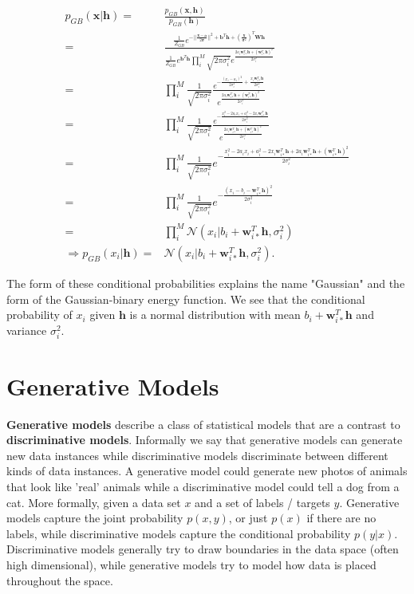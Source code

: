 \documentclass[%
oneside,                 %
final,                   %
10pt]{article}
\begin{document}
\begin{align}
	p_{GB} (\bm{x}|\bm{h})
	=& \frac{p_{GB} (\bm{x}, \bm{h})}{p_{GB} (\bm{h})} \nonumber \\
	=& \frac{\frac{1}{Z_{GB}} e^{-\vert\vert\frac{\bm{x} -\bm{a}}{2\bm{\sigma}}\vert\vert^2 + \bm{b}^T \bm{h} 
	+ (\frac{\bm{x}}{\bm{\sigma}^2})^T \bm{W}\bm{h}}}
	{\frac{1}{Z_{GB}} e^{\bm{b}^T \bm{h}} \prod_i^M
	\sqrt{2\pi \sigma_i^2}
	e^{\frac{2a_i \bm{w}_{i\ast}^T \bm{h} +(\bm{w}_{i\ast}^T \bm{h})^2 }{2\sigma_i^2}}}
	\nonumber \\
	=& \prod_i^M \frac{1}{\sqrt{2\pi \sigma_i^2}}
	\frac{e^{- \frac{(x_i - a_i)^2}{2\sigma_i^2} + \frac{x_i \bm{w}_{i\ast}^T \bm{h}}{2\sigma_i^2} }}
	{e^{\frac{2a_i \bm{w}_{i\ast}^T \bm{h} +(\bm{w}_{i\ast}^T \bm{h})^2 }{2\sigma_i^2}}}
	\nonumber \\
	=& \prod_i^M \frac{1}{\sqrt{2\pi \sigma_i^2}}
	\frac{e^{-\frac{x_i^2 - 2a_i x_i + a_i^2 - 2x_i \bm{w}_{i\ast}^T\bm{h} }{2\sigma_i^2} } }
	{e^{\frac{2a_i \bm{w}_{i\ast}^T \bm{h} +(\bm{w}_{i\ast}^T \bm{h})^2 }{2\sigma_i^2}}}
	\nonumber \\
	=& \prod_i^M \frac{1}{\sqrt{2\pi \sigma_i^2}}
	e^{- \frac{x_i^2 - 2a_i x_i + a_i^2 - 2x_i \bm{w}_{i\ast}^T\bm{h}
	+ 2a_i \bm{w}_{i\ast}^T \bm{h} +(\bm{w}_{i\ast}^T \bm{h})^2}
	{2\sigma_i^2} }
	\nonumber \\
	=& \prod_i^M \frac{1}{\sqrt{2\pi \sigma_i^2}}
	e^{ - \frac{(x_i - b_i - \bm{w}_{i\ast}^T \bm{h})^2}{2\sigma_i^2}} \nonumber \\
	=& \prod_i^M \mathcal{N}
	(x_i | b_i + \bm{w}_{i\ast}^T \bm{h}, \sigma_i^2) \\
	\Rightarrow p_{GB} (x_i|\bm{h}) =& \mathcal{N}
	(x_i | b_i + \bm{w}_{i\ast}^T \bm{h}, \sigma_i^2) .
\end{align}

The form of these conditional probabilities explains the name
"Gaussian" and the form of the Gaussian-binary energy function. We see
that the conditional probability of $x_i$ given $\bm{h}$ is a normal
distribution with mean $b_i + \bm{w}_{i\ast}^T \bm{h}$ and variance
$\sigma_i^2$.

\section*{Generative Models}
\textbf{Generative models} describe a class of statistical models that are a contrast
to \textbf{discriminative models}. Informally we say that generative models can
generate new data instances while discriminative models discriminate between
different kinds of data instances. A generative model could generate new photos
of animals that look like 'real' animals while a discriminative model could tell
a dog from a cat. More formally, given a data set $x$ and a set of labels /
targets $y$. Generative models capture the joint probability $p(x, y)$, or
just $p(x)$ if there are no labels, while discriminative models capture the
conditional probability $p(y | x)$. Discriminative models generally try to draw
boundaries in the data space (often high dimensional), while generative models
try to model how data is placed throughout the space.
\end{document}
